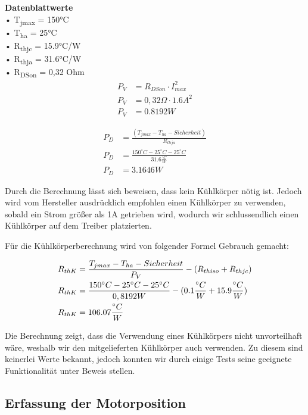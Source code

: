 \textbf{Datenblattwerte}\\
• T\textsubscript{jmax} = 150°C \\
• T\textsubscript{ha} = 25°C \\
• R\textsubscript{thjc} = 15.9°C/W \\
• R\textsubscript{thja} = 31.6°C/W \\
• R\textsubscript{DSon} = 0,32 Ohm \\

\begin{align*}
P_V &= R_{DSon} \cdot I_{max}^2 \\
P_V &= 0,32\Omega \cdot 1.6A^2 \\
P_V &= 0.8192W
\end{align*}

\begin{align*}
P_D &= \frac{(T_{jmax} - T_{ha} - Sicherheit)}{R_{thja}} \\
P_D &= \frac{150^{\circ}C - 25^{\circ}C - 25^{\circ}C}{31.6\frac{{}^{\circ}C}{W}} \\
P_D &= 3.1646W
\end{align*}

Durch die Berechnung lässt sich beweisen, dass kein Kühlkörper nötig ist.
Jedoch wird vom Hersteller ausdrücklich empfohlen einen Kühlkörper zu verwenden, sobald ein Strom größer als 1A getrieben wird, wodurch wir schlussendlich einen Kühlkörper auf dem Treiber platzierten.

Für die Kühlkörperberechnung wird von folgender Formel Gebrauch gemacht:

\begin{align}
R_{thK} &= \frac{T_{jmax} - T_{ha} - Sicherheit}{P_V} - (R_{thiso} + R_{thjc}) \\
R_{thK} &= \frac{150^{\circ}C - 25^{\circ}C - 25^{\circ}C}{0,8192W} - (0.1\frac{{}^{\circ}C}{W} + 15.9\frac{{}^{\circ}C}{W}) \notag \\
R_{thK} &= 106.07\frac{{}^{\circ}C}{W}  \notag
\end{align}

Die Berechnung zeigt, dass die Verwendung eines Kühlkörpers nicht unvorteilhaft wäre, weshalb wir den mitgelieferten Kühlkörper auch verwenden.
Zu diesem sind keinerlei Werte bekannt, jedoch konnten wir durch einige Tests seine geeignete Funktionalität unter Beweis stellen.

\subsection{Erfassung der Motorposition}

